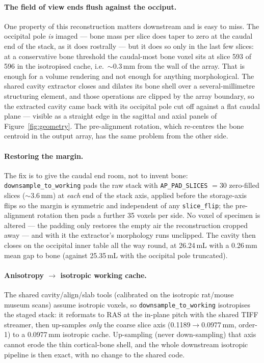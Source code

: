 \documentclass{compactarticle}
\begin{document}
\paragraph{The field of view ends flush against the occiput.}
One property of this reconstruction matters downstream and is easy to
miss. The occipital pole \emph{is} imaged --- bone mass per slice does
taper to zero at the caudal end of the stack, as it does rostrally ---
but it does so only in the last few slices: at a conservative bone
threshold the caudal-most bone voxel sits at slice 593 of 596 in the
isotropised cache, i.e.\ ${\sim}0.3$\,mm from the wall of the array.
That is enough for a volume rendering and not enough for anything
morphological. The shared cavity extractor closes and dilates its bone
shell over a several-millimetre structuring element, and those
operations are clipped by the array boundary, so the extracted cavity
came back with its occipital pole cut off against a flat caudal plane
--- visible as a straight edge in the sagittal and axial panels of
Figure~\ref{fig:geometry}. The pre-alignment rotation, which re-centres
the bone centroid in the output array, has the same problem from the
other side.

\paragraph{Restoring the margin.}
The fix is to give the caudal end room, not to invent bone:
\texttt{downsample\_to\_working} pads the raw stack with
\texttt{AP\_PAD\_SLICES} $=30$ zero-filled slices (${\sim}3.6$\,mm) at
\emph{each} end of the stack axis, applied before the storage-axis
flips so the margin is symmetric and independent of any
\texttt{slice\_flip}; the pre-alignment rotation then pads a further 35
voxels per side. No voxel of specimen is altered --- the padding only
restores the empty air the reconstruction cropped away --- and with it
the extractor's morphology runs unclipped. The cavity then closes on
the occipital inner table all the way round, at 26.24\,mL with a
0.26\,mm mean gap to bone (against 25.35\,mL with the occipital pole
truncated).

\paragraph{Anisotropy $\to$ isotropic working cache.}
The shared cavity/align/slab tools (calibrated on the isotropic
rat/mouse museum scans) assume isotropic voxels, so
\texttt{downsample\_to\_working} isotropises the staged stack: it
reformats to RAS at the in-plane pitch with the shared TIFF streamer,
then up-samples \emph{only} the coarse slice axis
(0.1189$\to$0.0977\,mm, order-1) to a 0.0977\,mm isotropic cache.
Up-sampling (never down-sampling) that axis cannot erode the thin
cortical-bone shell, and the whole downstream isotropic pipeline is then
exact, with no change to the shared code.
\end{document}
